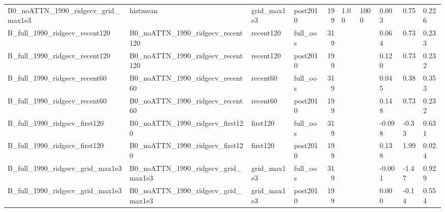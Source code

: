 \begin{table}
\begin{tabular}{llllrlllll}
B0\_noATTN\_1990\_ridgecv\_grid\_max1e3 & histmean & grid\_max1e3 & post2010 & 199 & 1.00 & 1000 & 0.003 & 0.75 & 0.226 \\
B\_full\_1990\_ridgecv\_recent120 & B0\_noATTN\_1990\_ridgecv\_recent120 & recent120 & full\_oos & 319 &  &  & 0.064 & 0.73 & 0.233 \\
B\_full\_1990\_ridgecv\_recent120 & B0\_noATTN\_1990\_ridgecv\_recent120 & recent120 & post2010 & 199 &  &  & 0.120 & 0.73 & 0.232 \\
B\_full\_1990\_ridgecv\_recent60 & B0\_noATTN\_1990\_ridgecv\_recent60 & recent60 & full\_oos & 319 &  &  & 0.045 & 0.38 & 0.353 \\
B\_full\_1990\_ridgecv\_recent60 & B0\_noATTN\_1990\_ridgecv\_recent60 & recent60 & post2010 & 199 &  &  & 0.148 & 0.73 & 0.232 \\
B\_full\_1990\_ridgecv\_first120 & B0\_noATTN\_1990\_ridgecv\_first120 & first120 & full\_oos & 319 &  &  & -0.098 & -0.33 & 0.631 \\
B\_full\_1990\_ridgecv\_first120 & B0\_noATTN\_1990\_ridgecv\_first120 & first120 & post2010 & 199 &  &  & 0.138 & 1.99 & 0.024 \\
B\_full\_1990\_ridgecv\_grid\_max1e3 & B0\_noATTN\_1990\_ridgecv\_grid\_max1e3 & grid\_max1e3 & full\_oos & 319 &  &  & -0.001 & -1.47 & 0.929 \\
B\_full\_1990\_ridgecv\_grid\_max1e3 & B0\_noATTN\_1990\_ridgecv\_grid\_max1e3 & grid\_max1e3 & post2010 & 199 &  &  & 0.000 & -0.14 & 0.554 \\
\bottomrule
\end{tabular}
\end{table}
